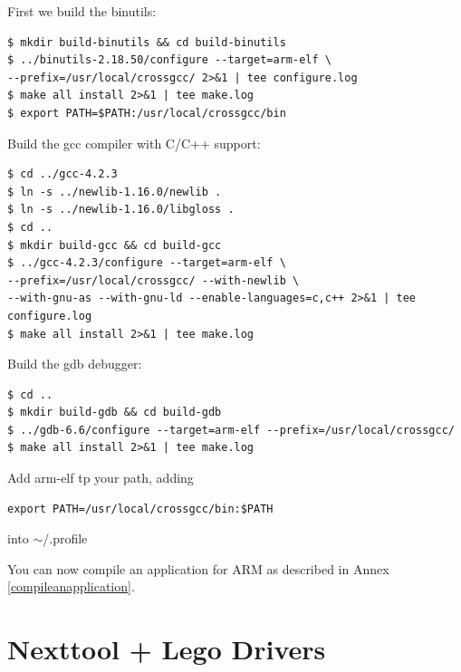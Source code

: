 First we build the binutils:

\begin{verbatim}
$ mkdir build-binutils && cd build-binutils
$ ../binutils-2.18.50/configure --target=arm-elf \
--prefix=/usr/local/crossgcc/ 2>&1 | tee configure.log
$ make all install 2>&1 | tee make.log
$ export PATH=$PATH:/usr/local/crossgcc/bin
\end{verbatim}

Build the gcc compiler with C/C++ support:

\begin{verbatim}
$ cd ../gcc-4.2.3
$ ln -s ../newlib-1.16.0/newlib .
$ ln -s ../newlib-1.16.0/libgloss .
$ cd ..
$ mkdir build-gcc && cd build-gcc
$ ../gcc-4.2.3/configure --target=arm-elf \
--prefix=/usr/local/crossgcc/ --with-newlib \
--with-gnu-as --with-gnu-ld --enable-languages=c,c++ 2>&1 | tee configure.log
$ make all install 2>&1 | tee make.log
\end{verbatim}

Build the gdb debugger:

\begin{verbatim}
$ cd ..
$ mkdir build-gdb && cd build-gdb
$ ../gdb-6.6/configure --target=arm-elf --prefix=/usr/local/crossgcc/
$ make all install 2>&1 | tee make.log
\end{verbatim}

Add arm-elf tp your path, adding
\begin{verbatim}
export PATH=/usr/local/crossgcc/bin:$PATH
\end{verbatim}
into $\sim$/.profile

You can now compile an application for ARM as described in Annex \ref{compileanapplication}.

\section{Nexttool + Lego Drivers} \label{drivers}
